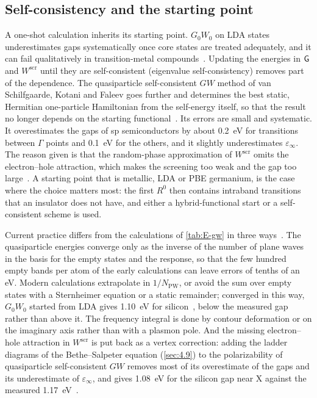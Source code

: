 \subsection{Self-consistency and the starting point}

A one-shot calculation inherits its starting point. $G_0W_0$ on LDA states underestimates gaps systematically once core states are treated adequately, and it can fail qualitatively in transition-metal compounds~\cite{vanschilfgaarde2006quasiparticle}. Updating the energies in $\mathsf{G}$ and $W^{\mathrm{scr}}$ until they are self-consistent (eigenvalue self-consistency) removes part of the dependence. The quasiparticle self-consistent $GW$ method of van Schilfgaarde, Kotani and Faleev goes further and determines the best static, Hermitian one-particle Hamiltonian from the self-energy itself, so that the result no longer depends on the starting functional~\cite{vanschilfgaarde2006quasiparticle}. Its errors are small and systematic. It overestimates the gaps of sp semiconductors by about \SI{0.2}{eV} for transitions between $\Gamma$ points and \SI{0.1}{eV} for the others, and it slightly underestimates $\varepsilon_\infty$. The reason given is that the random-phase approximation of $W^{\mathrm{scr}}$ omits the electron--hole attraction, which makes the screening too weak and the gap too large~\cite{vanschilfgaarde2006quasiparticle}. A starting point that is metallic, LDA or PBE germanium, is the case where the choice matters most: the first $R^0$ then contains intraband transitions that an insulator does not have, and either a hybrid-functional start or a self-consistent scheme is used.

Current practice differs from the calculations of \cref{tab:E-gw} in three ways~\cite[Sects.~IV\,C--F, V and~XI\,D]{golze2019gw}. The quasiparticle energies converge only as the inverse of the number of plane waves in the basis for the empty states and the response, so that the few hundred empty bands per atom of the early calculations can leave errors of tenths of an eV. Modern calculations extrapolate in $1/N_{\mathrm{PW}}$, or avoid the sum over empty states with a Sternheimer equation or a static remainder; converged in this way, $G_0W_0$ started from LDA gives \SI{1.10}{eV} for silicon~\cite[Sect.~IV\,C]{klimes2014predictive}, below the measured gap rather than above it. The frequency integral is done by contour deformation or on the imaginary axis rather than with a plasmon pole. And the missing electron--hole attraction in $W^{\mathrm{scr}}$ is put back as a vertex correction: adding the ladder diagrams of the Bethe--Salpeter equation (\cref{sec:4.9}) to the polarizability of quasiparticle self-consistent $GW$ removes most of its overestimate of the gaps and its underestimate of $\varepsilon_\infty$, and gives \SI{1.08}{eV} for the silicon gap near X against the measured \SI{1.17}{eV}~\cite[Table~1]{cunningham2023qsgw}.

